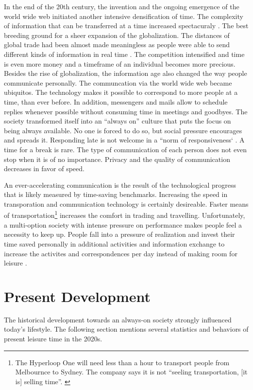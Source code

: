 \documentclass[12pt,numbers=noenddot,parskip,bibliography=totocnumbered,listof=totocnumbered]{scrreprt}
\begin{document}
In the end of the 20th century, the invention and the ongoing emergence of the world wide web initiated another intensive densification of time. The complexity of information that can be transferred at a time increased spectacuraly \citep[p.45]{wajcman2014}. The best breeding ground for a sheer expansion of the globalization. The distances of global trade had been almost made meaningless as people were able to send different kinds of information in real time \citep[p.17]{wajcman2014}. The competition intensified and time is even more money and a timeframe of an individual becomes more precious. Besides the rise of globalization, the information age also changed the way people communicate personally. The communcation via the world wide web became ubiquitos. The technology makes it possible to correspond to more people at a time, than ever before. In addition, messengers and mails allow to schedule replies whenever possible without consuming time in meetings and goodbyes. The society transformed itself into an ``always on'' culture that puts the focus on being always available. No one is forced to do so, but social pressure encourages and spreads it. Responding late is not welcome in a ``norm of responsiveness` \citep[p.96]{wajcman2014}. A time for a break is rare. The type of communication of each person does not even stop when it is of no importance. Privacy and the quality of communication decreases in favor of speed.

An ever-accelerating communication is the result of the technological progress that is likely measured by time-saving benchmarks. Increasing the speed in transporation and communication technology is certainly desireable. Faster means of transportation\footnote{The Hyperloop One will need less than a hour to transport people from Melbournce to Sydney. The company says it is not ``seeling transportation, [it is] selling time''. \cite{hyperloop2017}} increases the comfort in trading and travelling. Unfortunately, a multi-option society with intense pressure on performance makes people feel a necessity to keep up. People fall into a pressure of realization and invest their time saved personally in additional activities and information exchange to increase the activites and correspondences per day instead of making room for leisure \citep[p.27-30]{gross1994}.

\section{Present Development}
The historical development towards an always-on society strongly influenced today's lifestyle. The following section mentions several statistics and behaviors of present leisure time in the 2020s.
\end{document}

